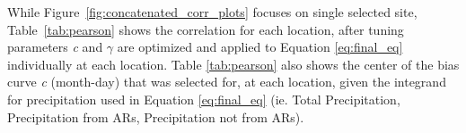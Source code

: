\documentclass[12pts,draft]{AR_analysis_}
\begin{document}


While Figure~\ref{fig:concatenated_corr_plots} focuses on single
selected site, Table~\ref{tab:pearson} shows the correlation for each location, after
tuning parameters \emph{c} and $\gamma$ are optimized and applied to Equation 
\ref{eq:final_eq} individually at each location.
Table \ref{tab:pearson} also shows the center of the bias curve \emph{c} 
(month-day)
that was selected for, at each location, given the integrand for 
precipitation used in
Equation \ref{eq:final_eq} (ie. Total Precipitation, Precipitation from ARs, 
Precipitation not from ARs).  


\end{document}
